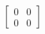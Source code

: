 \documentclass[preview]{standalone}
\begin{document}
\begin{align*}
\begin{bmatrix} 0 & 0 \\ 0 & 0 \end{bmatrix}
\end{align*}
\end{document}
